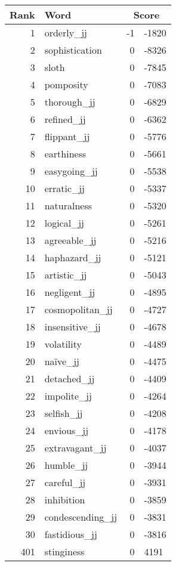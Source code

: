 \begin{longtable}[!htbp]{| rlr@{.}l |}
    \hline
    \textbf{Rank} & \textbf{Word} & \multicolumn{2}{c|}{\textbf{Score}} \\
    \hline
    \endhead
    1 & orderly\_jj & -1 & -1820 \\
    2 & sophistication & 0 & -8326 \\
    3 & sloth & 0 & -7845 \\
    4 & pomposity & 0 & -7083 \\
    5 & thorough\_jj & 0 & -6829 \\
    6 & refined\_jj & 0 & -6362 \\
    7 & flippant\_jj & 0 & -5776 \\
    8 & earthiness & 0 & -5661 \\
    9 & easygoing\_jj & 0 & -5538 \\
    10 & erratic\_jj & 0 & -5337 \\
    11 & naturalness & 0 & -5320 \\
    12 & logical\_jj & 0 & -5261 \\
    13 & agreeable\_jj & 0 & -5216 \\
    14 & haphazard\_jj & 0 & -5121 \\
    15 & artistic\_jj & 0 & -5043 \\
    16 & negligent\_jj & 0 & -4895 \\
    17 & cosmopolitan\_jj & 0 & -4727 \\
    18 & insensitive\_jj & 0 & -4678 \\
    19 & volatility & 0 & -4489 \\
    20 & naïve\_jj & 0 & -4475 \\
    21 & detached\_jj & 0 & -4409 \\
    22 & impolite\_jj & 0 & -4264 \\
    23 & selfish\_jj & 0 & -4208 \\
    24 & envious\_jj & 0 & -4178 \\
    25 & extravagant\_jj & 0 & -4037 \\
    26 & humble\_jj & 0 & -3944 \\
    27 & careful\_jj & 0 & -3931 \\
    28 & inhibition & 0 & -3859 \\
    29 & condescending\_jj & 0 & -3831 \\
    30 & fastidious\_jj & 0 & -3816 \\
    401 & stinginess & 0 & 4191 \\

\end{longtable}
